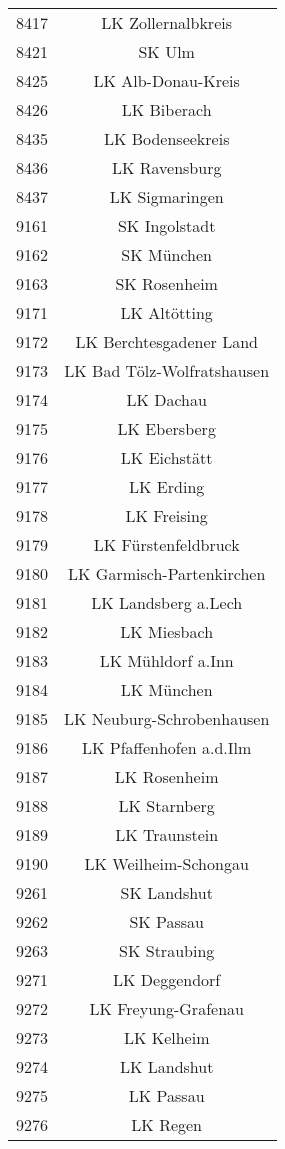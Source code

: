 \begin{tabular}{c c}
    8417&LK Zollernalbkreis\\ 
    8421&SK Ulm\\ 
    8425&LK Alb-Donau-Kreis\\ 
    8426&LK Biberach\\ 
    8435&LK Bodenseekreis\\ 
    8436&LK Ravensburg\\ 
    8437&LK Sigmaringen\\ 
    9161&SK Ingolstadt\\ 
    9162&SK München\\ 
    9163&SK Rosenheim\\ 
    9171&LK Altötting\\ 
    9172&LK Berchtesgadener Land\\ 
    9173&LK Bad Tölz-Wolfratshausen\\ 
    9174&LK Dachau\\ 
    9175&LK Ebersberg\\ 
    9176&LK Eichstätt\\ 
    9177&LK Erding\\ 
    9178&LK Freising\\ 
    9179&LK Fürstenfeldbruck\\ 
    9180&LK Garmisch-Partenkirchen\\ 
    9181&LK Landsberg a.Lech\\ 
    9182&LK Miesbach\\ 
    9183&LK Mühldorf a.Inn\\ 
    9184&LK München\\ 
    9185&LK Neuburg-Schrobenhausen\\ 
    9186&LK Pfaffenhofen a.d.Ilm\\ 
    9187&LK Rosenheim\\ 
    9188&LK Starnberg\\ 
    9189&LK Traunstein\\ 
    9190&LK Weilheim-Schongau\\ 
    9261&SK Landshut\\ 
    9262&SK Passau\\ 
    9263&SK Straubing\\ 
    9271&LK Deggendorf\\ 
    9272&LK Freyung-Grafenau\\ 
    9273&LK Kelheim\\ 
    9274&LK Landshut\\ 
    9275&LK Passau\\ 
    9276&LK Regen\\ 

\end{tabular}
